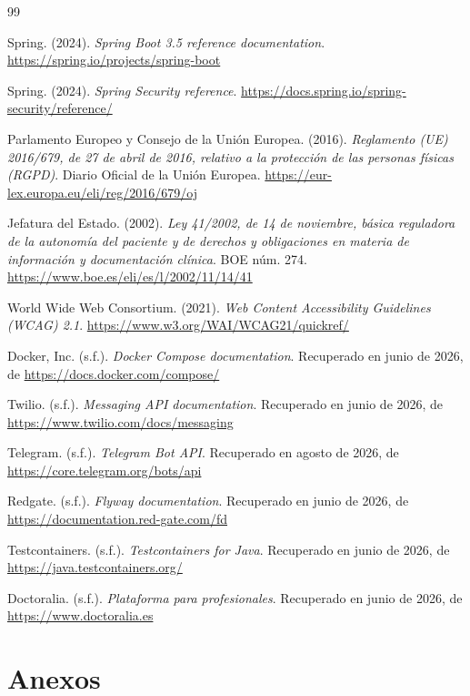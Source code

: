 \documentclass[12pt,a4paper]{report}
\begin{document}
\begin{thebibliography}{99}

Spring. (2024). \textit{Spring Boot 3.5 reference documentation}. \url{https://spring.io/projects/spring-boot}

Spring. (2024). \textit{Spring Security reference}. \url{https://docs.spring.io/spring-security/reference/}

Parlamento Europeo y Consejo de la Unión Europea. (2016). \textit{Reglamento (UE) 2016/679, de 27 de abril de 2016, relativo a la protección de las personas físicas (RGPD)}. Diario Oficial de la Unión Europea. \url{https://eur-lex.europa.eu/eli/reg/2016/679/oj}

Jefatura del Estado. (2002). \textit{Ley 41/2002, de 14 de noviembre, básica reguladora de la autonomía del paciente y de derechos y obligaciones en materia de información y documentación clínica}. BOE núm. 274. \url{https://www.boe.es/eli/es/l/2002/11/14/41}

World Wide Web Consortium. (2021). \textit{Web Content Accessibility Guidelines (WCAG) 2.1}. \url{https://www.w3.org/WAI/WCAG21/quickref/}

Docker, Inc. (s.f.). \textit{Docker Compose documentation}. Recuperado en junio de 2026, de \url{https://docs.docker.com/compose/}

Twilio. (s.f.). \textit{Messaging API documentation}. Recuperado en junio de 2026, de \url{https://www.twilio.com/docs/messaging}

Telegram. (s.f.). \textit{Telegram Bot API}. Recuperado en agosto de 2026, de \url{https://core.telegram.org/bots/api}

Redgate. (s.f.). \textit{Flyway documentation}. Recuperado en junio de 2026, de \url{https://documentation.red-gate.com/fd}

Testcontainers. (s.f.). \textit{Testcontainers for Java}. Recuperado en junio de 2026, de \url{https://java.testcontainers.org/}

Doctoralia. (s.f.). \textit{Plataforma para profesionales}. Recuperado en junio de 2026, de \url{https://www.doctoralia.es}

\end{thebibliography}

\chapter*{Anexos}
\end{document}
